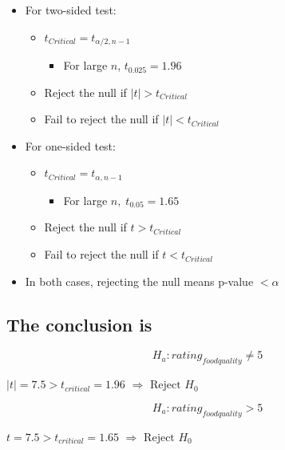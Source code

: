 \documentclass[10pt,article]{article}
\begin{document}
\begin{multicols}{2}
\begin{itemize}
\item For two-sided test:
\begin{itemize}
\item \(t_{Critical} = t_{\alpha/2, n-1}\)
\begin{itemize}
\item For large \(n\), \(t_{0.025}=1.96\)
\end{itemize}
\item Reject the null if \(|t| > t_{Critical}\)
\item Fail to reject the null if \(|t| < t_{Critical}\)
\end{itemize}
\end{itemize}

\begin{itemize}
\item For one-sided test:
\begin{itemize}
\item \(t_{Critical} = t_{\alpha, n-1}\)
\begin{itemize}
\item For large \(n, \; t_{0.05} = 1.65\)
\end{itemize}
\item Reject the null if \(t > t_{Critical}\)
\item Fail to reject the null if \(t < t_{Critical}\)
\end{itemize}
\end{itemize}
\end{multicols}

\begin{itemize}
\item In both cases, rejecting the null means p-value \(< \alpha\)
\end{itemize}

\subsection{The conclusion is}
\label{sec:org68f50b1}
\begin{multicols}{2}
\[ H_a: rating_{foodquality} \ne 5 \]

 \( |t| = 7.5 > t_{critical}=1.96 \)  \(\Rightarrow \text{ Reject } H_0 \)





\[ H_a: rating_{foodquality} > 5 \]

 \( t = 7.5 > t_{critical}=1.65 \)  \(\Rightarrow \text{ Reject } H_0 \)
\end{multicols}
\end{document}
